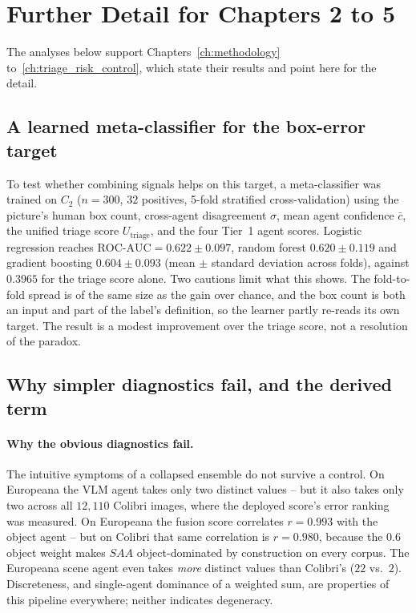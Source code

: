 \documentclass[12pt,a4paper]{report}
\begin{document}
\section{Further Detail for Chapters 2 to 5}
\label{sec:moved_detail}
The analyses below support Chapters~\ref{ch:methodology} to~\ref{ch:triage_risk_control}, which state their results and point here for the detail.

\subsection{A learned meta-classifier for the box-error target}
\label{sec:moved_meta}
To test whether combining signals helps on this target, a meta-classifier was trained on $C_2$ ($n=300$, $32$ positives, 5-fold stratified cross-validation) using the picture's human box count, cross-agent disagreement $\sigma$, mean agent confidence $\bar{c}$, the unified triage score $U_{\text{triage}}$, and the four Tier~1 agent scores. Logistic regression reaches $\text{ROC-AUC} = 0.622 \pm 0.097$, random forest $0.620 \pm 0.119$ and gradient boosting $0.604 \pm 0.093$ (mean $\pm$ standard deviation across folds), against $0.3965$ for the triage score alone. Two cautions limit what this shows. The fold-to-fold spread is of the same size as the gain over chance, and the box count is both an input and part of the label's definition, so the learner partly re-reads its own target. The result is a modest improvement over the triage score, not a resolution of the paradox.

\subsection{Why simpler diagnostics fail, and the derived term}
\label{sec:moved_precondition}
\paragraph{Why the obvious diagnostics fail.} The intuitive symptoms of a collapsed ensemble do not survive a control. On Europeana the VLM agent takes only two distinct values -- but it also takes only two across all $12{,}110$ Colibri images, where the deployed score's error ranking was measured. On Europeana the fusion score correlates $r=0.993$ with the object agent -- but on Colibri that same correlation is $r=0.980$, because the $0.6$ object weight makes $SAA$ object-dominated by construction on every corpus. The Europeana scene agent even takes \emph{more} distinct values than Colibri's ($22$ vs.\ $2$). Discreteness, and single-agent dominance of a weighted sum, are properties of this pipeline everywhere; neither indicates degeneracy.
\end{document}
